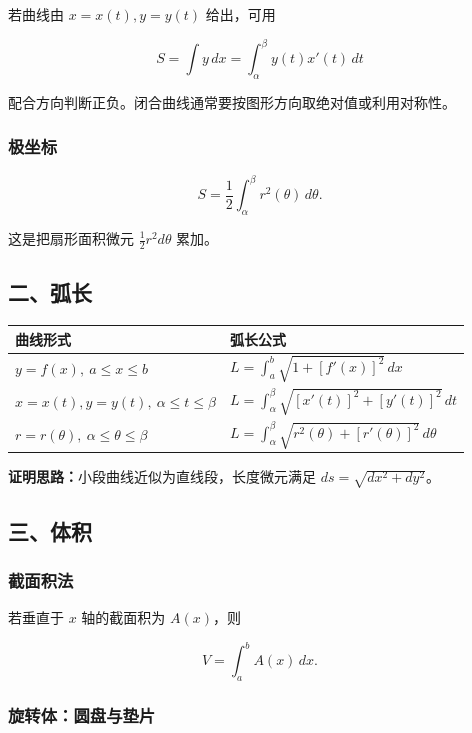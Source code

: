 若曲线由 \(x=x(t),y=y(t)\) 给出，可用

\[
      S=\int y\,dx=\int_{\alpha}^{\beta}y(t)x'(t)\,dt
    \]

配合方向判断正负。闭合曲线通常要按图形方向取绝对值或利用对称性。

\subsubsection*{极坐标}

\[
      S=\frac12\int_{\alpha}^{\beta}r^2(\theta)\,d\theta.
    \]

这是把扇形面积微元 \(\frac12r^2d\theta\) 累加。

\subsection*{二、弧长}

\begin{center}
\small
\begin{tabularx}{\linewidth}{|>{\raggedright\arraybackslash}X|>{\raggedright\arraybackslash}X|}
\hline
\textbf{曲线形式} & \textbf{弧长公式} \\ \hline
\(y=f(x),\ a\le x\le b\) & \(\displaystyle L=\int_a^b\sqrt{1+[f'(x)]^2}\,dx\) \\ \hline
\(x=x(t),y=y(t),\ \alpha\le t\le\beta\) & \(\displaystyle L=\int_\alpha^\beta\sqrt{[x'(t)]^2+[y'(t)]^2}\,dt\) \\ \hline
\(r=r(\theta),\ \alpha\le\theta\le\beta\) & \(\displaystyle L=\int_\alpha^\beta\sqrt{r^2(\theta)+[r'(\theta)]^2}\,d\theta\) \\ \hline
\end{tabularx}
\end{center}

\textbf{证明思路：}小段曲线近似为直线段，长度微元满足 \(ds=\sqrt{dx^2+dy^2}\)。

\subsection*{三、体积}

\subsubsection*{截面积法}

若垂直于 \(x\) 轴的截面积为 \(A(x)\)，则

\[
      V=\int_a^b A(x)\,dx.
    \]

\subsubsection*{旋转体：圆盘与垫片}

